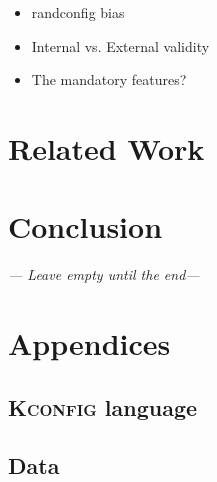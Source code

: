 \documentclass[a4paper,11pt]{report}
\begin{document}


\begin{itemize}
    \item randconfig bias
    \item Internal vs. External validity
    \item The mandatory features?
\end{itemize}



\newpage
\chapter{Related Work}

\newpage
\chapter{Conclusion}
\emph{--- Leave empty until the end---}




\newpage




            \newpage
            \chapter{Appendices}


            \section{\textsc{Kconfig} language}
            \label{app:kconfig}


            \section{Data}
\end{document}
